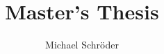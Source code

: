 \documentclass[a4paper,11pt]{book}
\begin{document}
\frontmatter

\title{Master's Thesis}
\author{Michael Schröder}
\date{\draftnotice}
\maketitle
\clearemptydoublepage




\mainmatter







\backmatter


\end{document}
